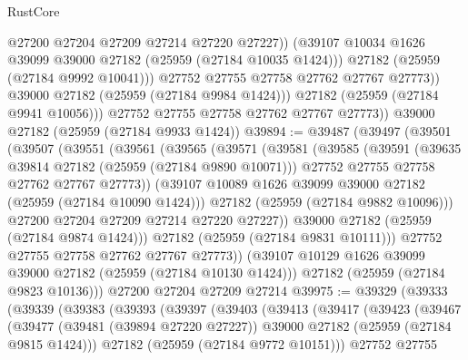 \begin{lexlean}{RustCore}
\begin{coremodule}
                      @27200
                      @27204
                      @27209
                      @27214
                      @27220
                      @27227))
                  (@39107 @10034 @1626 @39099 @39000 @27182 (@25959 (@27184 @10035 @1424)))
                  @27182
                  (@25959 (@27184 @9992 @10041)))
                @27752
                @27755
                @27758
                @27762
                @27767
                @27773))
            @39000
            @27182
            (@25959 (@27184 @9984 @1424)))
          @27182
          (@25959 (@27184 @9941 @10056)))
        @27752
        @27755
        @27758
        @27762
        @27767
        @27773))
    @39000
    @27182
    (@25959 (@27184 @9933 @1424))
@39894 := @39487
    (@39497
      (@39501
        (@39507
          (@39551
            (@39561
              (@39565
                (@39571
                  (@39581
                    (@39585
                      (@39591
                        (@39635 @39814 @27182 (@25959 (@27184 @9890 @10071)))
                        @27752
                        @27755
                        @27758
                        @27762
                        @27767
                        @27773))
                    (@39107 @10089 @1626 @39099 @39000 @27182 (@25959 (@27184 @10090 @1424)))
                    @27182
                    (@25959 (@27184 @9882 @10096)))
                  @27200
                  @27204
                  @27209
                  @27214
                  @27220
                  @27227))
              @39000
              @27182
              (@25959 (@27184 @9874 @1424)))
            @27182
            (@25959 (@27184 @9831 @10111)))
          @27752
          @27755
          @27758
          @27762
          @27767
          @27773))
      (@39107 @10129 @1626 @39099 @39000 @27182 (@25959 (@27184 @10130 @1424)))
      @27182
      (@25959 (@27184 @9823 @10136)))
    @27200
    @27204
    @27209
    @27214
@39975 := @39329
    (@39333
      (@39339
        (@39383
          (@39393
            (@39397
              (@39403
                (@39413
                  (@39417
                    (@39423
                      (@39467
                        (@39477
                          (@39481 (@39894 @27220 @27227))
                          @39000
                          @27182
                          (@25959 (@27184 @9815 @1424)))
                        @27182
                        (@25959 (@27184 @9772 @10151)))
                      @27752
                      @27755

\end{coremodule}
\end{lexlean}
